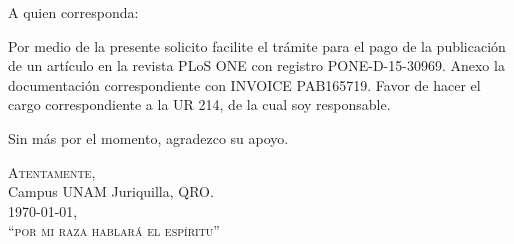 \documentclass[final,10pt]{letter}
\date{}  %
\begin{document}
  \setlength{\wpYoffset}{-10pt}
\pagestyle{empty}



\begin{letter}{%
}

\opening{A quien corresponda:}


Por medio de la presente solicito facilite el trámite para el pago de la publicación de un artículo en la revista PLoS ONE con registro PONE-D-15-30969. Anexo la documentación correspondiente con INVOICE PAB165719.
Favor de hacer el cargo correspondiente a la UR 214, de la cual soy responsable.

Sin más por el momento, agradezco su apoyo.

\bigskip

\begin{flushright}
  \closing{\textsc{Atentamente},\\
  Campus UNAM Juriquilla, QRO. \\
  \today,\\
  \textsc{``por mi raza hablará el espíritu''}  
}
\end{flushright}




\end{letter}
\end{document}
